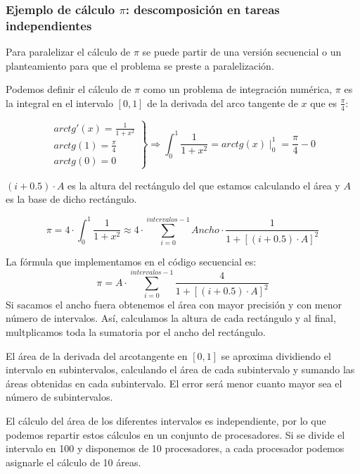 \documentclass[10pt,a4paper,spanish]{report}
\begin{document}
\textcolor[rgb]{0.2,0.4,0.8}{\subsubsection{Ejemplo de cálculo $\pi$: descomposición en tareas independientes}}
Para paralelizar el cálculo de $\pi$ se puede partir de una versión secuencial o un planteamiento para que el problema se preste a paralelización.

Podemos definir el cálculo de $\pi$  como un problema de integración numérica, $\pi$ es la integral en el intervalo $[0,1]$ de la derivada del arco tangente de $x$ que es $\frac{\pi}{4}$:

\begin{displaymath}
\left. \begin{array}{lll}
arctg'(x)=\frac{1}{1+x^2}\\
arctg(1)=\frac{\pi}{4}\\
arctg(0)=0
\end{array} \right\} \Rightarrow \int_0^1 \frac{1}{1+x^2} = arctg(x)\mid_0^1 = \frac{\pi}{4} - 0
\end{displaymath}

$(i+0.5)\cdot A$ es la altura del rectángulo del que estamos calculando el área y $A$ es la base de dicho rectángulo.

\begin{displaymath}
\pi = 4 \cdot \int_0^1 \frac{1}{1+x^2} \approx 4 \cdot \sum_{i=0}^{intervalos-1} Ancho \cdot \frac{1}{1+[(i+0.5)\cdot A]^2}
\end{displaymath}

La fórmula que implementamos en el código secuencial es:
\begin{displaymath}
\pi = A \cdot \sum_{i=0}^{intervalos-1} \frac{4}{1+[(i+0.5)\cdot A]^2}
\end{displaymath}
Si sacamos el ancho fuera obtenemos el área con mayor precisión y con menor número de intervalos. Así, calculamos la altura de cada rectángulo y al final, multplicamos toda la sumatoria por el ancho del rectángulo.

El área de la derivada del arcotangente en $[0,1]$ se aproxima dividiendo el intervalo en subintervalos, calculando el área de cada subintervalo y sumando las áreas obtenidas en cada subintervalo. El error será menor cuanto mayor sea el número de subintervalos.

El cálculo del área de los diferentes intervalos es independiente, por lo que podemos repartir estos cálculos en un conjunto de procesadores. Si se divide el intervalo en 100 y disponemos de 10 procesadores, a cada procesador podemos asignarle el cálculo de 10 áreas.
\end{document}
